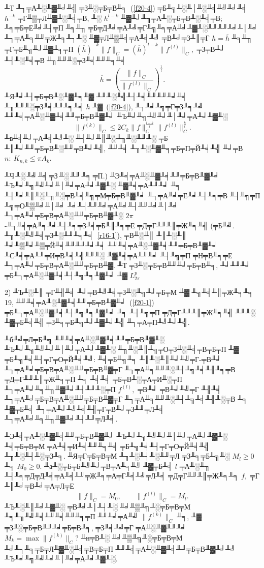 ╨Т ╨┐╤А╨░╨▓╨╛╨╣ ╤З╨░╤Б╤В╨╕~(\ref{f20-4}) ╤Б╨╗╨░╨│╨░╨╡╨╝╨╛╨╡  $h^{-k}$ ╤Г╨▒╤Л╨▓╨░╨╡╤В, ╨░ $h^{l-k}$
╨▓╨╛╨╖╤А╨░╤Б╤В╨░╨╡╤В; ╨╕╤Б╤Е╨╛╨┤╤П ╨╕╨╖ ╤Б╤Д╨╛╤А╨╝╤Г╨╗╨╕╤А╨╛╨▓╨░╨╜╨╜╨╛╨│╨╛ ╨┐╤А╨╕╨╜╤Ж╨╕╨┐╨░ ╨▓╤Л╨▒╨╡╤А╨╡╨╝ ╤В╨╛╤З╨║╤Г
 $h=\overline h$ ╨╕╨╖
 ╤Г╤Б╨╗╨╛╨▓╨╕╤П $(\overline h)^{-k}\|f\|_C=(\overline h)^{l-k}\|f^{(l)}\|_C,$ ╤З╤В╨╛ ╨┤╨░╨╡╤В ╨╖╨╜╨░╤З╨╡╨╜╨╕╨╡
 $$
  \overline h=\left( \frac{\|f\|_C}{\|f^{(l)}\|_C}\right)^{\frac{1}{l}}.
 $$
 ╨Я╨╛╨┤╤Б╤В╨░╨▓╨╕╨▓ ╨╜╨░╨╣╨┤╨╡╨╜╨╜╨╛╨╡ ╨╖╨╜╨░╤З╨╡╨╜╨╕╨╡ $h$
 ╨▓~(\ref{f20-4}), ╨┐╨╛╨╗╤Г╤З╨╕╨╝ ╨╜╨╡╤А╨░╨▓╨╡╨╜╤Б╤В╨▓╨╛ ╨Ъ╨╛╨╗╨╝╨╛╨│╨╛╤А╨╛╨▓╨░
 $$
 \|f^{(k)}\|_C\le {2C_k}\|f\|_C^{\frac{l-k}{l}}\|f^{(l)}\|_C^{\frac{k}{l}}.
 $$
 ╨в╨╡╨╛╤А╨╡╨╝╨░ ╨┤╨╛╨║╨░╨╖╨░╨╜╨░ ╤Б ╨║╨╛╨╜╤Б╤В╨░╨╜╤В╨╛╨╣, ╨╜╨╡ ╨╖╨░╨▓╨╕╤Б╤П╤Й╨╡╨╣ ╨╛╤В $n:\ K_{n,k}\le \pi A_k.$

 ╨Ч\,╨░\,╨╝\,╨╡\,╤З\,╨░\,╨╜\,╨╕\,╤П.) ╨Э╨╡╤А╨░╨▓╨╡╨╜╤Б╤В╨▓╨╛ ╨Ъ╨╛╨╗╨╝╨╛╨│╨╛╤А╨╛╨▓╨░ ╨▓╨╡╤А╨╜╨╛   ╨╕ ╨┤╨╛╨║╨░╨╖╨░╤В╨╡╨╗╤М╤Б╤В╨▓╨╛ ╨┐╤А╨╛╤Е╨╛╨┤╨╕╤В
 ╨┤╨╗╤П ╨╗╤О╨▒╨╛╨│╨╛ ╨╛╨┤╨╜╨╛╤А╨╛╨┤╨╜╨╛╨│╨╛ ╨┐╤А╨╛╤Б╤В╤А╨░╨╜╤Б╤В╨▓╨░
 $2\pi$-╨┐╨╡╤А╨╕╨╛╨┤╨╕╤З╨╡╤Б╨║╨╕╤Е ╤Д╤Г╨╜╨║╤Ж╨╕╨╣ (╤Б╨╝. ╨╖╨░╨╝╨╡╤З╨░╨╜╨╕╨╡~\ref{r16-1}), ╤В╨░╨║ ╨║╨░╨║
 ╨╛╨▒╨╛╨▒╤Й╨╡╨╜╨╜╨╛╨╡ ╨╜╨╡╤А╨░╨▓╨╡╨╜╤Б╤В╨▓╨╛ ╨С╨╡╤А╨╜╤И╤В╨╡╨╣╨╜╨░ ╨▓╨╡╤А╨╜╨╛ ╨┤╨╗╤П ╤Н╤В╨╕╤Е
 ╨┐╤А╨╛╤Б╤В╤А╨░╨╜╤Б╤В╨▓. ╨Т ╤З╨░╤Б╤В╨╜╨╛╤Б╤В╨╕, ╨╛╨╜╨╛ ╤Б╨┐╤А╨░╨▓╨╡╨┤╨╗╨╕╨▓╨╛ ╨▓ $L_{2\pi}^p$

 2) ╨Ъ╨░╨║ ╤Г╨╢╨╡ ╨╛╤В╨╝╨╡╤З╨░╨╗╨╛╤Б╤М ╨▓ ╨╗╨╡╨║╤Ж╨╕╨╕ 19, ╨╜╨╡╤А╨░╨▓╨╡╨╜╤Б╤В╨▓╨╛~(\ref{f20-1}) ╤Б╨┐╤А╨░╨▓╨╡╨┤╨╗╨╕╨▓╨╛ ╨╕ ╨┤╨╗╤П ╤Д╤Г╨╜╨║╤Ж╨╕╨╣ ╨╜╨░ ╨▓╤Б╨╡╨╣
 ╤З╨╕╤Б╨╗╨╛╨▓╨╛╨╣ ╨┐╤А╤П╨╝╨╛╨╣.


 ╨б╨╝╤Л╤Б╨╗ ╨╜╨╡╤А╨░╨▓╨╡╨╜╤Б╤В╨▓╨░ ╨Ъ╨╛╨╗╨╝╨╛╨│╨╛╤А╨╛╨▓╨░ ╨╖╨░╨║╨╗╤О╤З╨░╨╡╤В╤Б╤П ╨▓
 ╤Б╨╗╨╡╨┤╤Г╤О╤Й╨╡╨╝: ╨╡╤Б╨╗╨╕ ╨║╨░╨║╨╛╨╝╤Г-╤В╨╛ ╨┐╤А╨╛╤Б╤В╤А╨░╨╜╤Б╤В╨▓╤Г ╨┐╤А╨╕╨╜╨░╨┤╨╗╨╡╨╢╨╕╤В
 ╤Д╤Г╨╜╨║╤Ж╨╕╤П ╨╕ ╨╡╨╡ ╤Б╤В╨░╤А╤И╨░╤П ╨┐╤А╨╛╨╕╨╖╨▓╨╛╨┤╨╜╨░╤П $f^{(l)},$
 ╤В╨╛ ╤В╨╛╨╝╤Г ╨╢╨╡ ╨┐╤А╨╛╤Б╤В╤А╨░╨╜╤Б╤В╨▓╤Г ╨┐╤А╨╕╨╜╨░╨┤╨╗╨╡╨╢╨░╤В ╨╕ ╨▓╤Б╨╡ ╨┐╤А╨╛╨╝╨╡╨╢╤Г╤В╨╛╤З╨╜╤Л╨╡
 ╨┐╤А╨╛╨╕╨╖╨▓╨╛╨┤╨╜╤Л╨╡.

 ╨Э╨╡╤А╨░╨▓╨╡╨╜╤Б╤В╨▓╨╛ ╨Ъ╨╛╨╗╨╝╨╛╨│╨╛╤А╨╛╨▓╨░ ╨╡╤Б╤В╤М ╤А╨╡╤И╨╡╨╜╨╕╨╡ ╤Б╨╗╨╡╨┤╤Г╤О╤Й╨╡╨╣
  ╨╖╨░╨┤╨░╤З╨╕. ╨Я╤Г╤Б╤В╤М  ╨╖╨░╨┤╨░╨╜╤Л ╤З╨╕╤Б╨╗╨░ $M_l\ge 0$ ╨╕ $M_0\ge 0.$
 ╨а╨░╤Б╤Б╨╝╨╛╤В╤А╨╕╨╝ ╨▓╤Б╨╡ $l$ ╤А╨░╨╖ ╨┤╨╕╤Д╤Д╨╡╤А╨╡╨╜╤Ж╨╕╤А╤Г╨╡╨╝╤Л╨╡ ╤Д╤Г╨╜╨║╤Ж╨╕╨╕ $f,$
  ╤Г ╨║╨╛╤В╨╛╤А╤Л╤Е
 $$
 \|f\|_C=M_0,\qquad \|f^{(l)}\|_C=M_l.
 $$
 ╨Ъ╨░╨║╨╛╨▓╨░ ╤В╨╛╨│╨┤╨░ ╨╛╨▒╨╗╨░╤Б╤В╤М ╨╕╨╖╨╝╨╡╨╜╨╡╨╜╨╕╤П ╨╜╨╛╤А╨╝ $\|f^{(k)}\|_C$
 ╨╕, ╨▓ ╤З╨░╤Б╤В╨╜╨╛╤Б╤В╨╕,  ╤З╨╡╨╝╤Г ╤А╨░╨▓╨╜╨╛ $M_k=\max\|f^{(k)}\|_C?$
 ╨н╤В╨░ ╨╛╨▒╨╗╨░╤Б╤В╤М ╨╛╨┐╨╕╤Б╤Л╨▓╨░╨╡╤В╤Б╤П ╨╜╨╡╤А╨░╨▓╨╡╨╜╤Б╤В╨▓╨╛╨╝ ╨Ъ╨╛╨╗╨╝╨╛╨│╨╛╤А╨╛╨▓╨░.

